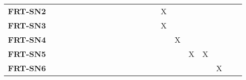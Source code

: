 \documentclass[12pt, titlepage]{article}
\begin{document}
\begin{landscape}
\begin{longtable}{|l|cccccccccccccccc|}
		\textbf{FRT-SN2} & ~                                                         & ~             & ~             & ~             & ~             & ~             & ~             & ~             & ~             & X             & ~             & ~             & ~             & ~             \\
		\textbf{FRT-SN3} & ~                                                         & ~             & ~             & ~             & ~             & ~             & ~             & ~             & ~             & X             & ~             & ~             & ~             & ~             \\
		\textbf{FRT-SN4} & ~                                                         & ~             & ~             & ~             & ~             & ~             & ~             & ~             & ~             & ~             & X             & ~             & ~             & ~             \\
		\textbf{FRT-SN5} & ~                                                         & ~             & ~             & ~             & ~             & ~             & ~             & ~             & ~             & ~             & ~             & X             & X             & ~             \\
		\textbf{FRT-SN6} & ~                                                         & ~             & ~             & ~             & ~             & ~             & ~             & ~             & ~             & ~             & ~             & ~             & ~             & X             \\
		\hline
	\end{longtable}

	\newpage


\end{landscape}
\end{document}
